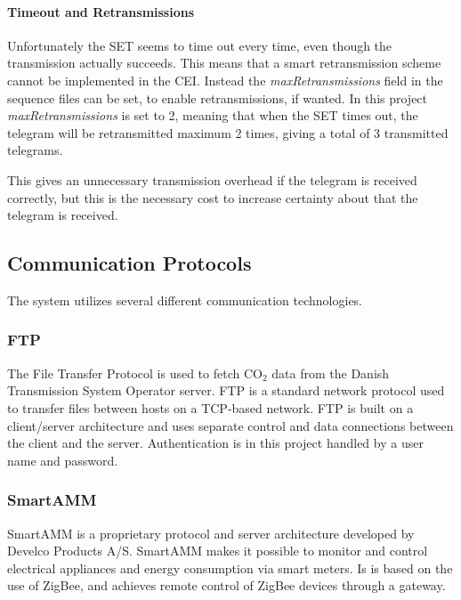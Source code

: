 \documentclass[Main]{subfiles}
\begin{document}
			\paragraph{Timeout and Retransmissions} %
			\label{par:timeout_and_retransmissions}
				Unfortunately the SET seems to time out every time, even though the transmission actually succeeds.
				This means that a smart retransmission scheme cannot be implemented in the CEI. 
				Instead the \emph{maxRetransmissions} field in the sequence files can be set, to enable retransmissions, if wanted. 
				In this project \emph{maxRetransmissions} is set to 2, meaning that when the SET times out, the telegram will be retransmitted maximum 2 times, giving a total of 3 transmitted telegrams.

				This gives an unnecessary transmission overhead if the telegram is received correctly, but this is the necessary cost to increase certainty about that the telegram is received.

	\newpage
	\subsection{Communication Protocols}
		The system utilizes several different communication technologies.

		\subsubsection{FTP}
			The File Transfer Protocol is used to fetch CO$_2$ data from the Danish Transmission System Operator server.
			FTP is a standard network protocol used to transfer files between hosts on a TCP-based network\cite{FTPWikipedia:Online}.
			FTP is built on a client/server architecture and uses separate control and data connections between the client and the server\cite{TCPIPProtocol}.
			Authentication is in this project handled by a user name and password.  


		\subsubsection{SmartAMM}
			SmartAMM is a proprietary protocol and server architecture developed by Develco Products A/S. 
			SmartAMM makes it possible to monitor and control electrical appliances and energy consumption via smart meters.
			Is is based on the use of ZigBee, and achieves remote control of ZigBee devices through a gateway\cite{SmartAMM:Online}.
\end{document}

